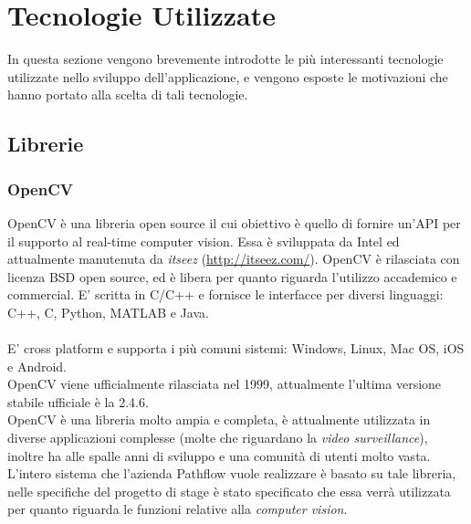 {\section{Tecnologie Utilizzate} \label{sec:tecnologie}
In questa sezione vengono brevemente introdotte le più interessanti tecnologie utilizzate nello sviluppo dell'applicazione, e vengono esposte le motivazioni che hanno portato alla scelta di tali tecnologie.
\subsection{Librerie}
\subsubsection{OpenCV}
OpenCV è una libreria open source il cui obiettivo è quello di fornire un'API per il supporto al real-time computer vision. Essa è sviluppata da Intel ed attualmente manutenuta da \textit{itseez} (\url{http://itseez.com/}). OpenCV è rilasciata con licenza BSD open source, ed è libera per quanto riguarda l'utilizzo accademico e commercial. E' scritta in C/C++ e fornisce le interfacce per diversi linguaggi: C++, C, Python, MATLAB e Java. \\ \\
E' cross platform e supporta i più comuni sistemi: Windows, Linux, Mac OS, iOS e Android. \\ 
OpenCV viene ufficialmente rilasciata nel 1999, attualmente l'ultima versione stabile ufficiale è la 2.4.6. \\
OpenCV è una libreria molto ampia e completa, è attualmente utilizzata in diverse applicazioni complesse (molte che riguardano la \textit{video surveillance}), inoltre ha alle spalle anni di sviluppo e una comunità di utenti molto vasta. \\
L'intero sistema che l'azienda Pathflow vuole realizzare è basato su tale libreria, nelle specifiche del progetto di stage è stato specificato che essa verrà utilizzata per quanto riguarda le funzioni relative alla \textit{computer vision}. 

}
